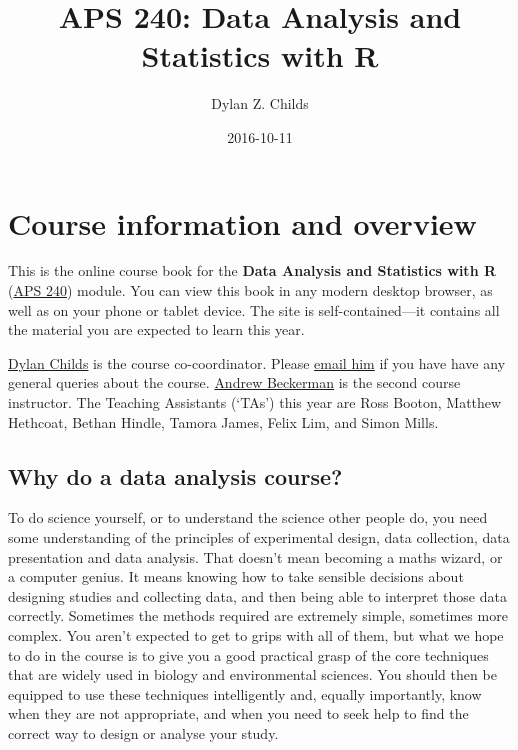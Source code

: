 \documentclass[]{book}
\title{APS 240: Data Analysis and Statistics with R}
\author{Dylan Z. Childs}
\date{2016-10-11}
\begin{document}
\maketitle

{
\setcounter{tocdepth}{1}
\tableofcontents
}
\chapter{Course information and
overview}\label{course-information-and-overview}

This is the online course book for the \textbf{Data Analysis and
Statistics with R}
(\href{https://www.shef.ac.uk/aps/currentug/level2/aps240}{APS 240})
module. You can view this book in any modern desktop browser, as well as
on your phone or tablet device. The site is self-contained---it contains
all the material you are expected to learn this year.

\href{https://www.shef.ac.uk/aps/staff-and-students/acadstaff/childs}{Dylan
Childs} is the course co-coordinator. Please
\href{mailto:d.childs@sheffield.ac.uk?Subject=APS\%20133\%20general\%20query}{email
him} if you have have any general queries about the course.
\href{https://www.shef.ac.uk/aps/staff-and-students/acadstaff/beckerman}{Andrew
Beckerman} is the second course instructor. The Teaching Assistants
(`TAs') this year are Ross Booton, Matthew Hethcoat, Bethan Hindle,
Tamora James, Felix Lim, and Simon Mills.

\section{Why do a data analysis course?}\label{why-data-analysis}

To do science yourself, or to understand the science other people do,
you need some understanding of the principles of experimental design,
data collection, data presentation and data analysis. That doesn't mean
becoming a maths wizard, or a computer genius. It means knowing how to
take sensible decisions about designing studies and collecting data, and
then being able to interpret those data correctly. Sometimes the methods
required are extremely simple, sometimes more complex. You aren't
expected to get to grips with all of them, but what we hope to do in the
course is to give you a good practical grasp of the core techniques that
are widely used in biology and environmental sciences. You should then
be equipped to use these techniques intelligently and, equally
importantly, know when they are not appropriate, and when you need to
seek help to find the correct way to design or analyse your study.
\end{document}

